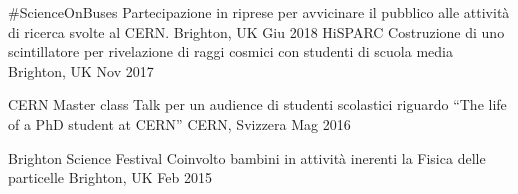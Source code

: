 
\begin{cvhonors}
  \cvhonor 
      {\#ScienceOnBuses}
      {Partecipazione in riprese per avvicinare il pubblico alle attività di ricerca svolte al CERN.}
      {Brighton, UK}
      {Giu 2018}
  \cvhonor 
      {HiSPARC}
      {Costruzione di uno scintillatore per rivelazione di raggi cosmici con studenti di scuola media}
      {Brighton, UK}
      {Nov 2017}

  \cvhonor
      {CERN Master class}
      {Talk per un audience di studenti scolastici riguardo ``The life of a PhD student at CERN''}
      {CERN, Svizzera}
      {Mag 2016}

  \cvhonor
      {Brighton Science Festival}
      {Coinvolto bambini in attività inerenti la Fisica delle particelle}
      {Brighton, UK}
      {Feb 2015}
\end{cvhonors}
